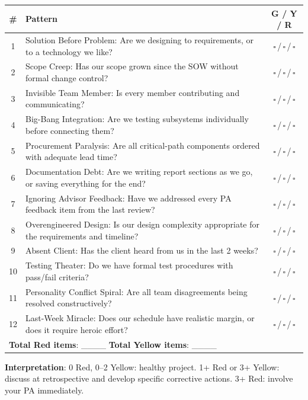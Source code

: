 \begin{center}\small
\begin{tabularx}{\textwidth}{c X c}
\toprule
\textbf{\#} & \textbf{Pattern} & \textbf{G / Y / R} \\
\midrule
1 & Solution Before Problem: Are we designing to requirements, or to a technology we like? & $\square$\,/\,$\square$\,/\,$\square$ \\
2 & Scope Creep: Has our scope grown since the SOW without formal change control? & $\square$\,/\,$\square$\,/\,$\square$ \\
3 & Invisible Team Member: Is every member contributing and communicating? & $\square$\,/\,$\square$\,/\,$\square$ \\
4 & Big-Bang Integration: Are we testing subsystems individually before connecting them? & $\square$\,/\,$\square$\,/\,$\square$ \\
5 & Procurement Paralysis: Are all critical-path components ordered with adequate lead time? & $\square$\,/\,$\square$\,/\,$\square$ \\
6 & Documentation Debt: Are we writing report sections as we go, or saving everything for the end? & $\square$\,/\,$\square$\,/\,$\square$ \\
7 & Ignoring Advisor Feedback: Have we addressed every PA feedback item from the last review? & $\square$\,/\,$\square$\,/\,$\square$ \\
8 & Overengineered Design: Is our design complexity appropriate for the requirements and timeline? & $\square$\,/\,$\square$\,/\,$\square$ \\
9 & Absent Client: Has the client heard from us in the last 2 weeks? & $\square$\,/\,$\square$\,/\,$\square$ \\
10 & Testing Theater: Do we have formal test procedures with pass/fail criteria? & $\square$\,/\,$\square$\,/\,$\square$ \\
11 & Personality Conflict Spiral: Are all team disagreements being resolved constructively? & $\square$\,/\,$\square$\,/\,$\square$ \\
12 & Last-Week Miracle: Does our schedule have realistic margin, or does it require heroic effort? & $\square$\,/\,$\square$\,/\,$\square$ \\
\midrule
\multicolumn{2}{l}{\textbf{Total Red items}: \_\_\_\_  \textbf{Total Yellow items}: \_\_\_\_} & \\
\bottomrule
\end{tabularx}
\end{center}

\textbf{Interpretation}: 0 Red, 0--2 Yellow: healthy project. 1+ Red or 3+ Yellow: discuss at retrospective and develop specific corrective actions. 3+ Red: involve your PA immediately.


